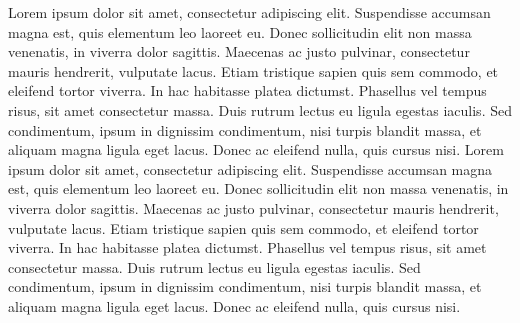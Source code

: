 \documentclass{article}
\begin{document}
\begin{flushleft}
Lorem ipsum dolor sit amet, consectetur adipiscing elit. Suspendisse accumsan magna est, quis elementum leo laoreet eu. Donec sollicitudin elit non massa venenatis, in viverra dolor sagittis. Maecenas ac justo pulvinar, consectetur mauris hendrerit, vulputate lacus. Etiam tristique sapien quis sem commodo, et eleifend tortor viverra. In hac habitasse platea dictumst. Phasellus vel tempus risus, sit amet consectetur massa. Duis rutrum lectus eu ligula egestas iaculis. Sed condimentum, ipsum in dignissim condimentum, nisi turpis blandit massa, et aliquam magna ligula eget lacus. Donec ac eleifend nulla, quis cursus nisi. Lorem ipsum dolor sit amet, consectetur adipiscing elit. Suspendisse accumsan magna est, quis elementum leo laoreet eu. Donec sollicitudin elit non massa venenatis, in viverra dolor sagittis. Maecenas ac justo pulvinar, consectetur mauris hendrerit, vulputate lacus. Etiam tristique sapien quis sem commodo, et eleifend tortor viverra. In hac habitasse platea dictumst. Phasellus vel tempus risus, sit amet consectetur massa. Duis rutrum lectus eu ligula egestas iaculis. Sed condimentum, ipsum in dignissim condimentum, nisi turpis blandit massa, et aliquam magna ligula eget lacus. Donec ac eleifend nulla, quis cursus nisi.
\end{flushleft}
\end{document}
